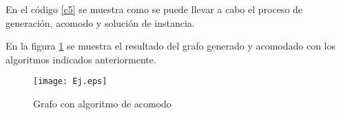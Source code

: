\documentclass[12pt]{article}
\begin{document}
En el código \ref{c5} se muestra como se puede llevar a cabo el proceso de generación, acomodo y solución de instancia.

\vspace{.6cm}
 \label{c5}
 
\vspace{.6cm}

En la figura \ref{f1} se muestra el resultado del grafo generado y acomodado con los algoritmos indicados anteriormente.

\begin{figure}[H]
\begin{center}
	\texttt{[image: Ej.eps]}
\end{center}
\vspace{-.6cm}
\caption{{\small Grafo con algoritmo de acomodo}} \label{f1}
\end{figure}
\end{document}
